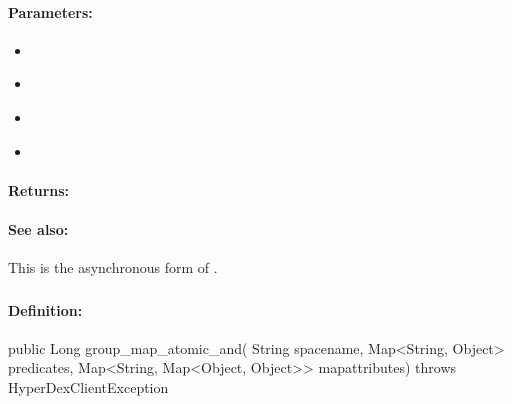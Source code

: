 \paragraph{Parameters:}
\begin{itemize}[noitemsep]
\item {}\\

\item {}\\

\item {}\\

\item {}\\

\end{itemize}

\paragraph{Returns:}


\paragraph{See also:}  This is the asynchronous form of .

\pagebreak
\subsubsection{}
\label{api:java:group_map_atomic_and}


\paragraph{Definition:}
\begin{javacode}
public Long group_map_atomic_and(
        String spacename,
        Map<String, Object> predicates,
        Map<String, Map<Object, Object>> mapattributes) throws HyperDexClientException
\end{javacode}

